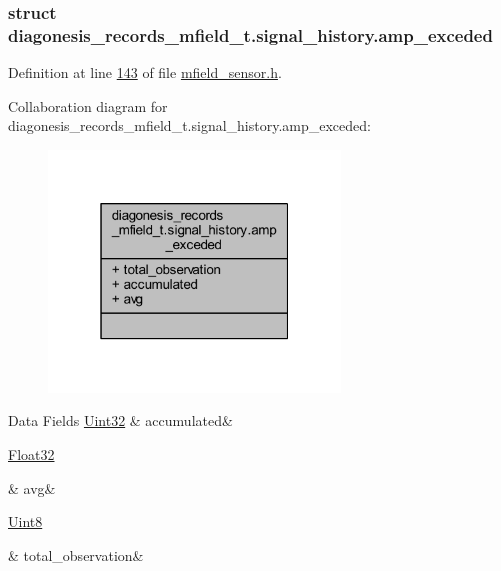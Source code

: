 \subsubsection{struct diagonesis\+\_\+records\+\_\+mfield\+\_\+t.\+signal\+\_\+history.\+amp\+\_\+exceded}


Definition at line \hyperlink{a00019_source_l00143}{143} of file \hyperlink{a00019_source}{mfield\+\_\+sensor.\+h}.



Collaboration diagram for diagonesis\+\_\+records\+\_\+mfield\+\_\+t.\+signal\+\_\+history.\+amp\+\_\+exceded\+:\nopagebreak
\begin{figure}[H]
\begin{center}
\leavevmode
\includegraphics[width=220pt]{dd/d11/a00960}
\end{center}
\end{figure}
\begin{DoxyFields}{Data Fields}
\hypertarget{a00019_a5f926b5475963464445c0d2055786b5f}{\hyperlink{a00072_aba99025e657f892beb7ff31cecf64653}{Uint32}}\label{a00019_a5f926b5475963464445c0d2055786b5f}
&
accumulated&
\\
\hline

\hypertarget{a00019_ae322d423f075b0ab2daad27011d24909}{\hyperlink{a00072_a87d38f886e617ced2698fc55afa07637}{Float32}}\label{a00019_ae322d423f075b0ab2daad27011d24909}
&
avg&
\\
\hline

\hypertarget{a00019_a5c752d693b04fadbacceeaffb3adf49a}{\hyperlink{a00072_af84840501dec18061d18a68c162a8fa2}{Uint8}}\label{a00019_a5c752d693b04fadbacceeaffb3adf49a}
&
total\+\_\+observation&
\\
\hline

\end{DoxyFields}
\label{dc/dc9/a00389}
\hypertarget{a00019_dc/dc9/a00389}{}
